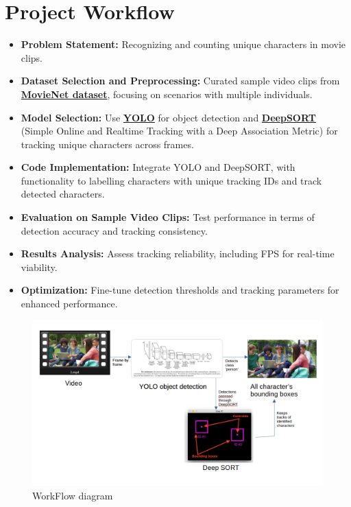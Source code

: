 \documentclass[twoside,english]{article}
\begin{document}
\section{Project Workflow}  
\begin{itemize}
    \setlength{\itemsep}{0.5mm}
    \item \textbf{Problem Statement:} Recognizing and counting unique characters in movie clips.
    \item \textbf{Dataset Selection and Preprocessing:} Curated sample video clips from \href{https://movienet.github.io/}{\textbf{MovieNet dataset}}, focusing on scenarios with multiple individuals.
    \item \textbf{Model Selection:} Use  \href{https://docs.ultralytics.com/}{\textbf{YOLO}} for object detection and \href{ https://github.com/nwojke/deep_sort}{\textbf{DeepSORT}}  (Simple Online and Realtime Tracking with a Deep Association Metric) for tracking unique characters across frames.
    \item \textbf{Code Implementation:} Integrate YOLO and DeepSORT, with functionality to labelling characters with unique tracking IDs and track detected characters.
    \item \textbf{Evaluation on Sample Video Clips:} Test performance in terms of detection accuracy and tracking consistency.
    \item \textbf{Results Analysis:} Assess tracking reliability, including FPS for real-time viability.
    \item \textbf{Optimization:} Fine-tune detection thresholds and tracking parameters for enhanced performance.
\end{itemize}


\begin{figure}[!h]
    \centering
    \includegraphics[width=0.8\linewidth]{imgs/workflow.png}
    \caption{WorkFlow diagram}
    \label{fig:enter-label}
\end{figure}
\end{document}
